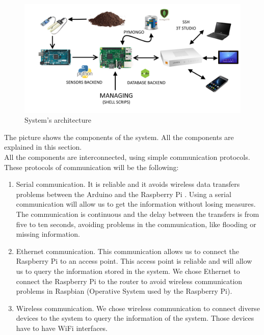\begin{figure}[H]
\begin{centering}
\includegraphics[scale=0.15]{IMGS/SYSTEM_SCHEMA.png}
\caption{System's architecture \label{System's architecture}}
\end{centering}
\end{figure}

The picture shows the components of the system. All the components are explained in this section.\\

All the components are interconnected, using simple communication protocols. These protocols of communication will be the following:

\begin{enumerate}

\item Serial communication. It is reliable and it avoids wireless data transfers problems between the Arduino and the Raspberry Pi \cite{what_is_raspberry_pi, raspberry_pi}. Using a serial communication will allow us to get the information without losing measures. The communication is continuous and the delay between the transfers is from five to ten seconds, avoiding problems in the communication, like flooding or missing information.

\item Ethernet communication. This communication allows us to connect the Raspberry Pi to an access point. This access point is reliable and will allow us to query the information stored in the system. We chose Ethernet to connect the Raspberry Pi to the router to avoid wireless communication problems in Raspbian \cite{raspbian} (Operative System used by the Raspberry Pi).

\item Wireless communication. We chose wireless communication to connect diverse devices to the system to query the information of the system. Those devices have to have WiFi interfaces.

\end{enumerate}

